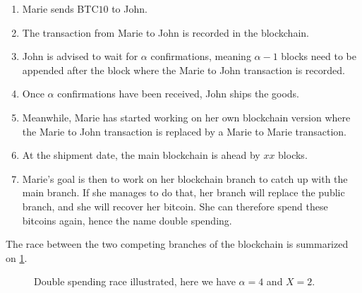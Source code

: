 \begin{enumerate}
\item Marie sends BTC$10$ to John.
\item The transaction from Marie to John is recorded in the blockchain.
\item John is advised to wait for $\alpha$ confirmations, meaning $\alpha-1$ blocks need to be appended after the block where the Marie to John transaction is recorded.
\item Once $\alpha$ confirmations have been received, John ships the goods.
\item Meanwhile, Marie has started working on her own blockchain version where the Marie to John transaction is replaced by a Marie to Marie transaction.
\item At the shipment date, the main blockchain is ahead by $xx$ blocks.
\item Marie's goal is then to work on her blockchain branch to catch up with the main branch. If she manages to do that, her branch will replace the public branch, and she will recover her bitcoin. She can therefore spend these bitcoins again, hence the name double spending.
\end{enumerate}
The race between the two competing branches of the blockchain is summarized on \cref{fig:dp_illustration}.
\begin{figure}[ht!]
\begin{center}
\end{center}
\caption{Double spending race illustrated, here we have $\alpha = 4$ and $X = 2$.}
\label{fig:dp_illustration}
\end{figure}
